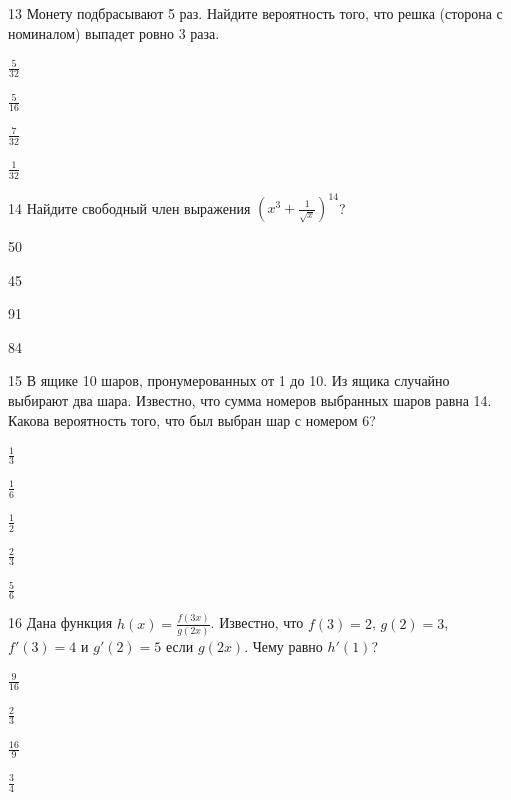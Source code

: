 \documentclass[14pt]{article}
\begin{document}
\begin{questionbox}{13}
    Монету подбрасывают 5 раз. Найдите вероятность того, что решка (сторона с номиналом) выпадет ровно 3 раза.
    \begin{options}
        \item \(\frac{5}{32}\)
        \item \(\frac{5}{16}\)
        \item \(\frac{7}{32}\)
        \item \(\frac{1}{32}\)
    \end{options}
\end{questionbox}

\begin{questionbox}{14}
    Найдите свободный член выражения \((x^3 + \frac{1}{\sqrt{x}})^{14}\)? 
    \begin{options}
        \item 50
        \item 45
        \item 91
        \item 84
    \end{options}
\end{questionbox}

\begin{questionbox}{15}
    В ящике 10 шаров, пронумерованных от 1 до 10. Из ящика случайно выбирают два шара. Известно, что сумма номеров выбранных шаров равна 14. Какова вероятность того, что был выбран шар с номером 6?
    \begin{options}
        \item \(\frac{1}{3}\)
        \item \(\frac{1}{6}\)
        \item \(\frac{1}{2}\)
        \item \(\frac{2}{3}\)
        \item \(\frac{5}{6}\)
    \end{options}
\end{questionbox}

\begin{questionbox}{16}
    Дана функция \(h(x) = \frac{f(3x)}{g(2x)}\). Известно, что \(f(3) = 2\), \(g(2) = 3\), \(f'(3) = 4\) и \(g'(2) = 5\) если \(g(2x)\). Чему равно \(h'(1)\)?
    \begin{options}
        \item \(\frac{9}{16}\)
        \item \(\frac{2}{3}\)
        \item \(\frac{16}{9}\)
        \item \(\frac{3}{4}\)
    \end{options}
\end{questionbox}
\end{document}
